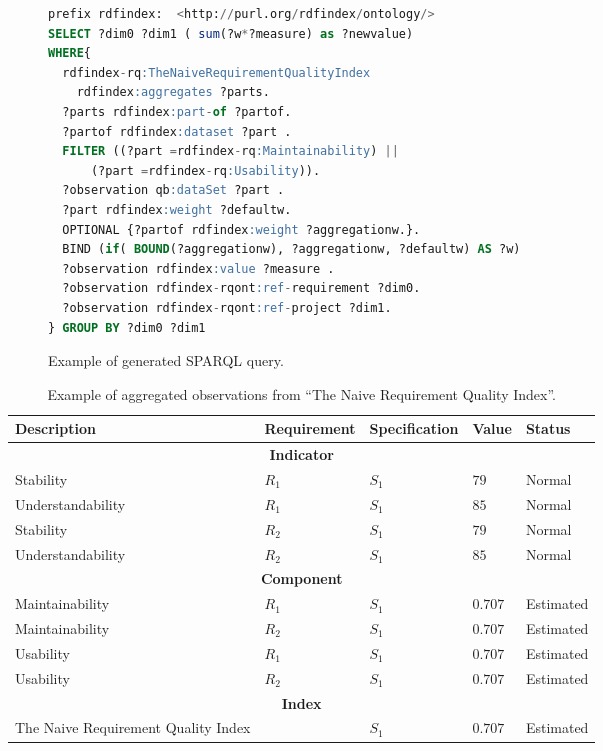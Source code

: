% 
\begin{figure}[!ht]
\begin{lstlisting}[language=SQL,basicstyle=\scriptsize]  
prefix rdfindex:  <http://purl.org/rdfindex/ontology/> 
SELECT ?dim0 ?dim1 ( sum(?w*?measure) as ?newvalue) 
WHERE{ 
  rdfindex-rq:TheNaiveRequirementQualityIndex  
    rdfindex:aggregates ?parts.
  ?parts rdfindex:part-of ?partof.
  ?partof rdfindex:dataset ?part .
  FILTER ((?part =rdfindex-rq:Maintainability) || 
	  (?part =rdfindex-rq:Usability)). 
  ?observation qb:dataSet ?part . 
  ?part rdfindex:weight ?defaultw.        
  OPTIONAL {?partof rdfindex:weight ?aggregationw.}.
  BIND (if( BOUND(?aggregationw), ?aggregationw, ?defaultw) AS ?w)
  ?observation rdfindex:value ?measure . 
  ?observation rdfindex-rqont:ref-requirement ?dim0. 
  ?observation rdfindex-rqont:ref-project ?dim1. 
} GROUP BY ?dim0 ?dim1 
\end{lstlisting}
\caption{Example of generated SPARQL query.}
 \label{fig:sparql-generated-query}
\end{figure}



\begin{table}[!htb]
\renewcommand{\arraystretch}{1.3}
\scriptsize
\begin{center}
\begin{tabular}{|p{2.5cm}|p{2cm}|p{2cm}|p{1cm}|p{1.8cm}|}
\hline
  \textbf{Description} & \textbf{Requirement} & \textbf{Specification} & \textbf{Value} & \textbf{Status} \\  \hline
  \multicolumn{5}{|c|}{\textbf{Indicator}} \\ \hline
  Stability & $R_1$ & $S_1$ & $79$ & Normal \\ \hline
  Understandability & $R_1$ & $S_1$  & $85$ & Normal\\ \hline
  Stability & $R_2$ & $S_1$ & $79$ & Normal \\ \hline
  Understandability & $R_2$ & $S_1$  & $85$ & Normal\\ \hline
  \multicolumn{5}{|c|}{\textbf{Component}} \\ \hline
  Maintainability  & $R_1$ & $S_1$ & $0.707$  & Estimated \\ \hline
  Maintainability  & $R_2$ & $S_1$ & $0.707$  & Estimated \\ \hline
  Usability  & $R_1$ & $S_1$ & $0.707$  & Estimated \\ \hline
  Usability  & $R_2$ & $S_1$ & $0.707$  & Estimated \\ \hline
 \multicolumn{5}{|c|}{\textbf{Index}} \\ \hline
  The Naive Requirement Quality Index  & & $S_1$ & $0.707$ & Estimated \\ \hline
  \hline
  \end{tabular}
  \caption{Example of aggregated observations from ``The Naive Requirement Quality Index''.}
  \label{tab:example-generated-wb}
  \end{center}	 
\end{table} 



